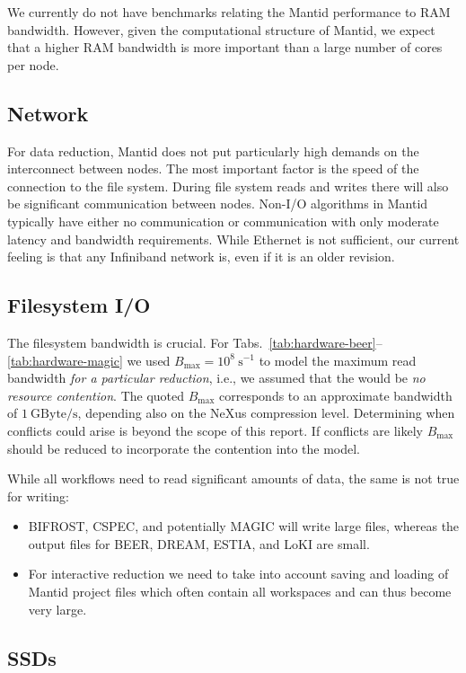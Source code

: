 \documentclass[a4paper,english,numbers=noenddot,bibliography=totoc,chapterprefix=on,DIV=12]{scrartcl}
\newcommand{\Bmax}{B_{\text{max}}}
\newcommand{\beer}{BEER\xspace}
\newcommand{\bifrost}{BIFROST\xspace}
\newcommand{\cspec}{CSPEC\xspace}
\newcommand{\dream}{DREAM\xspace}
\newcommand{\estia}{ESTIA\xspace}
\newcommand{\loki}{LoKI\xspace}
\newcommand{\magic}{MAGIC\xspace}
\newcommand{\mantid}{Mantid\xspace}
\newcommand{\nexus}{NeXus\xspace}
\begin{document}
We currently do not have benchmarks relating the \mantid performance to RAM bandwidth.
However, given the computational structure of \mantid, we expect that a higher RAM bandwidth is more important than a large number of cores per node.


\subsection{Network}

For data reduction, \mantid does not put particularly high demands on the interconnect between nodes.
The most important factor is the speed of the connection to the file system.
During file system reads and writes there will also be significant communication between nodes.
Non-I/O algorithms in \mantid typically have either no communication or communication with only moderate latency and bandwidth requirements.
While Ethernet is not sufficient, our current feeling is that any Infiniband network is, even if it is an older revision.


\subsection{Filesystem I/O}

The filesystem bandwidth is crucial.
For Tabs.~\ref{tab:hardware-beer}--\ref{tab:hardware-magic} we used $\Bmax = 10^8~\mathrm{s}^{-1}$ to model the maximum read bandwidth \emph{for a particular reduction}, i.e., we assumed that the would be \emph{no resource contention}.
The quoted $\Bmax$ corresponds to an approximate bandwidth of $1~\mathrm{GByte/s}$, depending also on the \nexus compression level.
Determining when conflicts could arise is beyond the scope of this report.
If conflicts are likely $\Bmax$ should be reduced to incorporate the contention into the model.

While all workflows need to read significant amounts of data, the same is not true for writing:
\begin{itemize}
  \item \bifrost, \cspec, and potentially \magic will write large files, whereas the output files for \beer, \dream, \estia, and \loki are small.
  \item For interactive reduction we need to take into account saving and loading of \mantid project files which often contain all workspaces and can thus become very large.
\end{itemize}


\subsection{SSDs}
\end{document}
